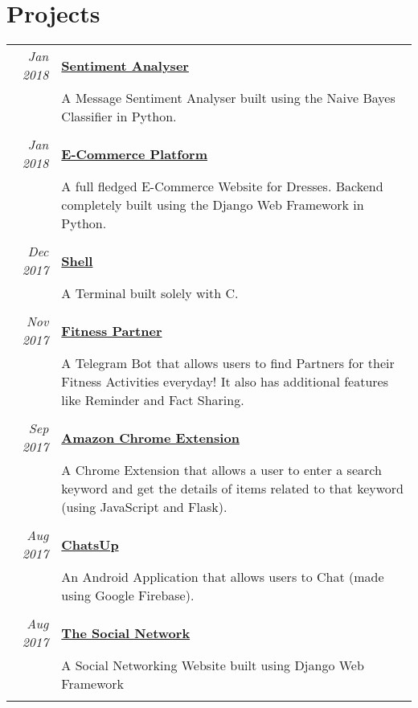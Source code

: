 \documentclass[a4paper,10pt]{article}
\begin{document}
\section{Projects}
\begin{tabular}{r|p{14.5cm}}
 \emph{Jan 2018} & \href{https://sentiment-analyser.yashitm.tech}{\textbf{Sentiment Analyser}} \\&\normalsize{A Message Sentiment Analyser built using the Naive Bayes Classifier in Python.}\\\multicolumn{2}{c}{} \\
 \emph{Jan 2018} & \href{https://github.com/YashitM/E-Commerce-Platform}{\textbf{E-Commerce Platform}} \\&\normalsize{A full fledged E-Commerce Website for Dresses. Backend completely built using the Django Web Framework in Python.}\\\multicolumn{2}{c}{} \\
 \emph{Dec 2017} & \href{https://shell.yashitm.tech}{\textbf{Shell}} \\&\normalsize{A Terminal built solely with C.}\\\multicolumn{2}{c}{} \\
 \emph{Nov 2017} & \href{https://fitnesspartner.yashitm.tech}{\textbf{Fitness Partner}} \\&\normalsize{A Telegram Bot that allows users to find Partners for their Fitness Activities everyday! It also has additional features like Reminder and Fact Sharing.}\\\multicolumn{2}{c}{} \\
 \emph{Sep 2017} & \href{https://github.com/YashitM/Amazon-Chrome-Extension}{\textbf{Amazon Chrome Extension}} \\&\normalsize{A Chrome Extension that allows a user to enter a search keyword and get the details of items related to that keyword (using JavaScript and Flask).}\\\multicolumn{2}{c}{} \\
 \emph{Aug 2017} & \href{https://github.com/YashitM/ChatsUp}{\textbf{ChatsUp}} \\&\normalsize{An Android Application that allows users to Chat (made using Google Firebase).}\\\multicolumn{2}{c}{} \\ 
 \emph{Aug 2017} & \href{https://github.com/abhay-tyagi/Social_Network}{\textbf{The Social Network}} \\&\normalsize{A Social Networking Website built using Django Web Framework}\\\multicolumn{2}{c}{} \\

\end{tabular}
\end{document}
